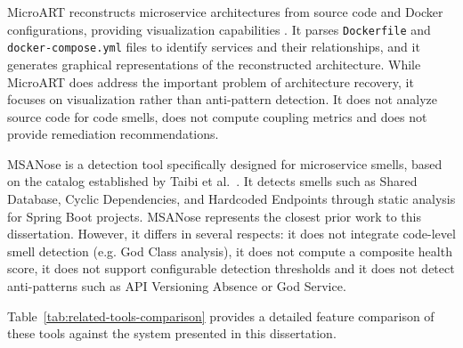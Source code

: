 \par MicroART reconstructs microservice architectures from source code and Docker configurations, providing visualization capabilities \cite{Granchelli2017}. It parses \texttt{Dockerfile} and \texttt{docker-compose.yml} files to identify services and their relationships, and it generates graphical representations of the reconstructed architecture. While MicroART does address the important problem of architecture recovery, it focuses on visualization rather than anti-pattern detection. It does not analyze source code for code smells, does not compute coupling metrics and does not provide remediation recommendations.

\par MSANose is a detection tool specifically designed for microservice smells, based on the catalog established by Taibi et al.\ \cite{Walker2020}. It detects smells such as Shared Database, Cyclic Dependencies, and Hardcoded Endpoints through static analysis for Spring Boot projects. MSANose represents the closest prior work to this dissertation. However, it differs in several respects: it does not integrate code-level smell detection (e.g. God Class analysis), it does not compute a composite health score, it does not support configurable detection thresholds and it does not detect anti-patterns such as API Versioning Absence or God Service.

Table~\ref{tab:related-tools-comparison} provides a detailed feature comparison of these tools against the system presented in this dissertation.

